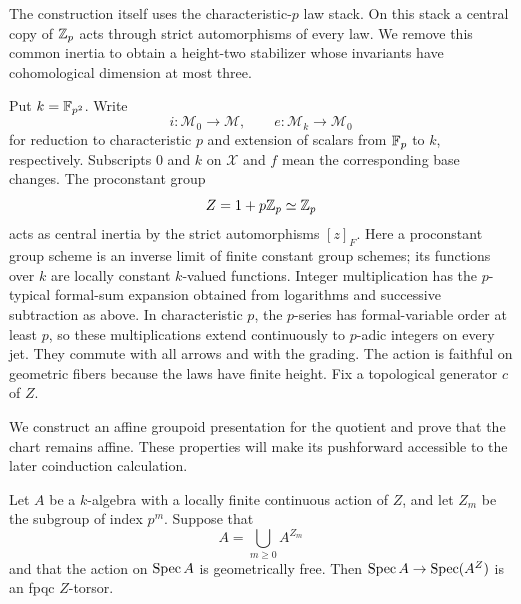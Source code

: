 The construction itself uses the characteristic-$p$ law stack.  On this
stack a central copy of $\mathbb Z_p$ acts through strict automorphisms of
every law.  We remove this common inertia to obtain a height-two
stabilizer whose invariants have cohomological dimension at most three.

Put $k=\mathbb F_{p^2}$.  Write
\[
 i:\mathcal M_0\longrightarrow\mathcal M,
 \qquad e:\mathcal M_k\longrightarrow\mathcal M_0
\]
for reduction to characteristic $p$ and extension of scalars from
$\mathbb F_p$ to $k$, respectively.  Subscripts $0$ and $k$ on $\mathcal X$
and $f$ mean the corresponding base changes.
The proconstant group
\[
 Z=1+p\mathbb Z_p\simeq\mathbb Z_p
\]
acts as central inertia by the strict automorphisms $[z]_F$.
Here a proconstant group scheme is an inverse limit of finite
constant group schemes; its functions over $k$ are locally constant
$k$-valued functions.  Integer multiplication has the $p$-typical
formal-sum expansion obtained from logarithms and successive
subtraction as above.  In characteristic $p$, the $p$-series has
formal-variable order at least $p$, so these multiplications extend
continuously to $p$-adic integers on every jet.  They commute with
all arrows and with the grading.  The action is faithful on geometric
fibers because the laws have finite height.  Fix a topological
generator $c$ of $Z$.

We construct an affine groupoid presentation for the quotient and
prove that the chart remains affine.  These properties will make its
pushforward accessible to the later coinduction calculation.

\begin{lemma}\label{geom:torsor}
Let $A$ be a $k$-algebra with a locally finite continuous action of
$Z$, and let $Z_m$ be the subgroup of index $p^m$.  Suppose that
\[
 A=\bigcup_{m\geq0}A^{Z_m}
\]
and that the action on $\operatorname{Spec} A$ is geometrically free.  Then
$\operatorname{Spec} A\to\operatorname{Spec}(A^Z)$ is an fpqc $Z$-torsor.
\end{lemma}

